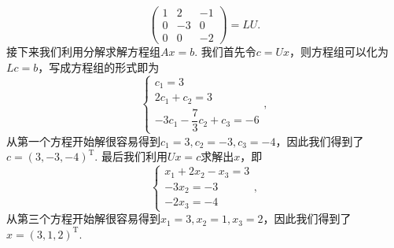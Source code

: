 \documentclass[12pt,fontset=fandol]{ctexart}
\begin{document}
\begin{solve}
\[\begin{pmatrix}
            1 & 2 & -1 \\ 0 & -3 & 0 \\ 0 & 0 & -2
        \end{pmatrix}=LU.\]
    接下来我们利用分解求解方程组$Ax=b$. 我们首先令$c=Ux$，则方程组可以化为$Lc=b$，写成方程组的形式即为
    \[\begin{cases}
            c_1=3 \\ 2c_1+c_2=3 \\ -3c_1-\dfrac{7}{3}c_2+c_3=-6
        \end{cases},\]
    从第一个方程开始解很容易得到$c_1=3,c_2=-3,c_3=-4$，因此我们得到了$c=(3,-3,-4)^\mathrm{T}$. 最后我们利用$Ux=c$求解出$x$，即
    \[\begin{cases}
            x_1+2x_2-x_3=3 \\ -3x_2=-3 \\ -2x_3=-4
        \end{cases},\]
    从第三个方程开始解很容易得到$x_1=3,x_2=1,x_3=2$，因此我们得到了$x=(3,1,2)^\mathrm{T}$.
\end{solve}
\end{document}
